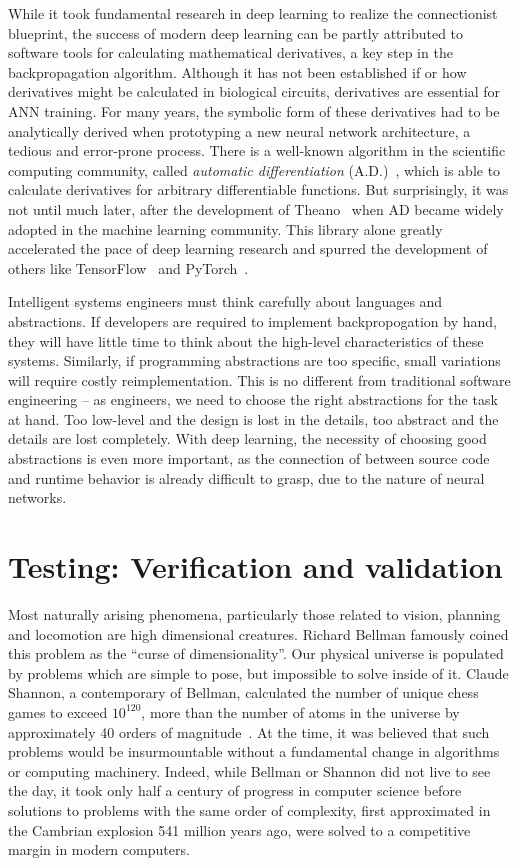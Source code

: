 \documentclass[12pt,initial,twoside,maitrise]{dms}
\numberwithin{equation}{section}
\numberwithin{table}{chapter}
\numberwithin{figure}{chapter}
\begin{document}
While it took fundamental research in deep learning to realize the connectionist blueprint, the success of modern deep learning can be partly attributed to software tools for calculating mathematical derivatives, a key step in the backpropagation algorithm. Although it has not been established if or how derivatives might be calculated in biological circuits, derivatives are essential for ANN training. For many years, the symbolic form of these derivatives had to be analytically derived when prototyping a new neural network architecture, a tedious and error-prone process. There is a well-known algorithm in the scientific computing community, called \textit{automatic differentiation} (A.D.)~\cite{linnainmaa1970representation, griewank1989automatic}, which is able to calculate derivatives for arbitrary differentiable functions. But surprisingly, it was not until much later, after the development of Theano~\cite{theano} when AD became widely adopted in the machine learning community. This library alone greatly accelerated the pace of deep learning research and spurred the development of others like TensorFlow~\cite{abadi2016tensorflow} and PyTorch~\cite{paszke2017automatic}.

Intelligent systems engineers must think carefully about languages and abstractions. If developers are required to implement backpropogation by hand, they will have little time to think about the high-level characteristics of these systems. Similarly, if programming abstractions are too specific, small variations will require costly reimplementation. This is no different from traditional software engineering -- as engineers, we need to choose the right abstractions for the task at hand. Too low-level and the design is lost in the details, too abstract and the details are lost completely. With deep learning, the necessity of choosing good abstractions is even more important, as the connection of between source code and runtime behavior is already difficult to grasp, due to the nature of neural networks.

\section{Testing: Verification and validation}

Most naturally arising phenomena, particularly those related to vision, planning and locomotion are high dimensional creatures. Richard Bellman famously coined this problem as the ``curse of dimensionality''. Our physical universe is populated by problems which are simple to pose, but impossible to solve inside of it. Claude Shannon, a contemporary of Bellman, calculated the number of unique chess games to exceed $10^{120}$, more than the number of atoms in the universe by approximately 40 orders of magnitude~\cite{shannon1950xxii}. At the time, it was believed that such problems would be insurmountable without a fundamental change in algorithms or computing machinery. Indeed, while Bellman or Shannon did not live to see the day, it took only half a century of progress in computer science before solutions to problems with the same order of complexity, first approximated in the Cambrian explosion 541 million years ago, were solved to a competitive margin in modern computers.
\end{document}
